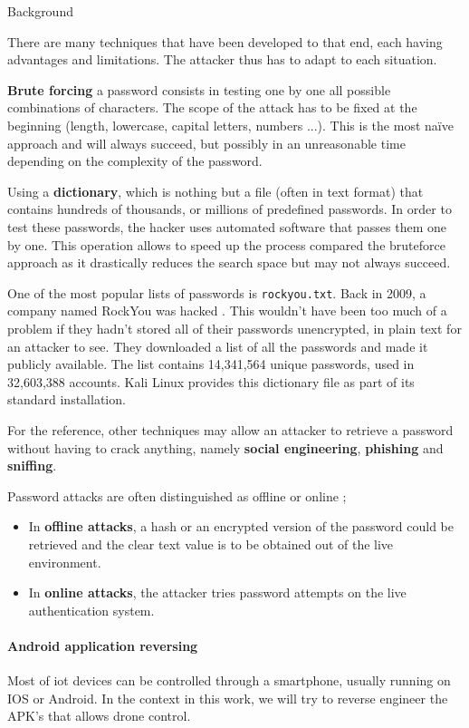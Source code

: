 \begin{chaptercover}{Background}
\begin{indentbox}{1cm}
There are many techniques that have been developed to that end, each having advantages and limitations. The attacker thus has to adapt to each situation.

\textbf{Brute forcing} a password consists in testing one by one all possible combinations of characters. The scope of the attack has to be fixed at the beginning (length, lowercase, capital letters, numbers ...). This is the most naïve approach and will always succeed, but possibly in an unreasonable time depending on the complexity of the password.

Using a \textbf{dictionary}, which is nothing but a file (often in text format) that contains hundreds of thousands, or millions of predefined passwords. In order to test these passwords, the hacker uses automated software that passes them one by one. This operation allows to speed up the process compared the bruteforce approach as it drastically reduces the search space but may not always succeed.

\begin{info}
One of the most popular lists of passwords is \texttt{rockyou.txt}. Back in 2009, a company named RockYou was hacked \cite{rockyou-hack}. This wouldn't have been too much of a problem if they hadn't stored all of their passwords unencrypted, in plain text for an attacker to see. They downloaded a list of all the passwords and made it publicly available. The list contains 14,341,564 unique passwords, used in 32,603,388 accounts. Kali Linux provides this dictionary file as part of its standard installation.
\end{info}

For the reference, other techniques may allow an attacker to retrieve a password without having to crack anything, namely \textbf{social engineering}, \textbf{phishing} and \textbf{sniffing}.

Password attacks are often distinguished as offline or online ;
\begin{itemize}
  \item In \textbf{offline attacks}, a hash or an encrypted version of the password could be retrieved and the clear text value is to be obtained out of the live environment.
  \item In \textbf{online attacks}, the attacker tries password attempts on the live authentication system.
\end{itemize}
\end{indentbox}

\paragraph{Android application reversing} Most of \acrshort{iot} devices can be controlled through a smartphone, usually running on IOS or Android. In the context in this work, we will try to reverse engineer the APK’s that allows drone control.


\end{chaptercover}
